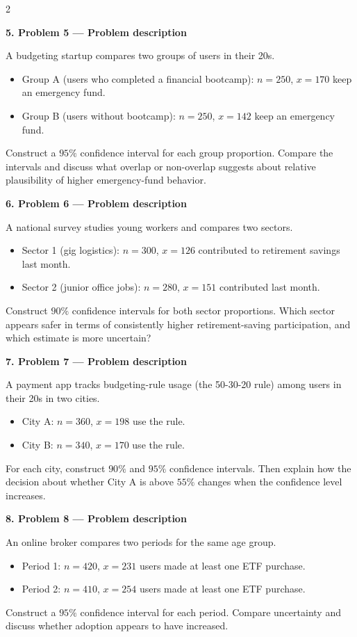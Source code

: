 \documentclass[12pt]{article}
\newcommand{\SubsectionBox}[1]{%
\noindent\colorbox{gray!30}{\parbox{\linewidth}{\textbf{#1}}}\par\vspace{0.35cm}%
}
\begin{document}
\begin{multicols}{2}
\vspace{0.25cm}
\SubsectionBox{5. Problem 5 --- Problem description}\vspace{-0.25cm}
A budgeting startup compares two groups of users in their 20s.
\begin{itemize}
  \item Group A (users who completed a financial bootcamp): \(n=250\), \(x=170\) keep an emergency fund.
  \item Group B (users without bootcamp): \(n=250\), \(x=142\) keep an emergency fund.
\end{itemize}
Construct a \(95\%\) confidence interval for each group proportion. Compare the intervals and discuss what overlap or non-overlap suggests about relative plausibility of higher emergency-fund behavior.

\vspace{0.25cm}
\SubsectionBox{6. Problem 6 --- Problem description}\vspace{-0.25cm}
A national survey studies young workers and compares two sectors.
\begin{itemize}
  \item Sector 1 (gig logistics): \(n=300\), \(x=126\) contributed to retirement savings last month.
  \item Sector 2 (junior office jobs): \(n=280\), \(x=151\) contributed last month.
\end{itemize}
Construct \(90\%\) confidence intervals for both sector proportions. Which sector appears safer in terms of consistently higher retirement-saving participation, and which estimate is more uncertain?

\vspace{0.25cm}
\SubsectionBox{7. Problem 7 --- Problem description}\vspace{-0.25cm}
A payment app tracks budgeting-rule usage (the 50-30-20 rule) among users in their 20s in two cities.
\begin{itemize}
  \item City A: \(n=360\), \(x=198\) use the rule.
  \item City B: \(n=340\), \(x=170\) use the rule.
\end{itemize}
For each city, construct \(90\%\) and \(95\%\) confidence intervals. Then explain how the decision about whether City A is above \(55\%\) changes when the confidence level increases.

\vspace{0.25cm}
\SubsectionBox{8. Problem 8 --- Problem description}\vspace{-0.25cm}
An online broker compares two periods for the same age group.
\begin{itemize}
  \item Period 1: \(n=420\), \(x=231\) users made at least one ETF purchase.
  \item Period 2: \(n=410\), \(x=254\) users made at least one ETF purchase.
\end{itemize}
Construct a \(95\%\) confidence interval for each period. Compare uncertainty and discuss whether adoption appears to have increased.


\end{multicols}
\end{document}
